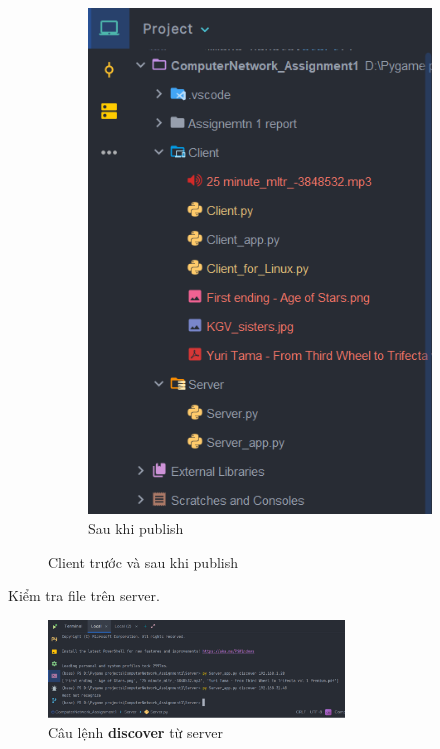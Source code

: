\documentclass[a4paper]{article}
\begin{document}
\begin{figure}[h]
\begin{center}
\begin{subfigure}[b]{0.35\textwidth}
				\includegraphics[width=\textwidth]{tests/client_af_publish.png}
				\hspace{\textwidth}
				\caption{Sau khi publish}
			\end{subfigure}
			\caption{Client trước và sau khi publish}
		\end{center}
	\end{figure}
	\newpage
	Kiểm tra file trên server.
	\begin{figure}[h]
		\begin{center}
			\includegraphics[width=0.7\textwidth]{tests/server_dis_af_publish.png}
			\hspace{\textwidth}
			\caption{Câu lệnh \textbf{discover} từ server}
			\label{server_dis1_command}
		\end{center}
	\end{figure}
\end{document}
